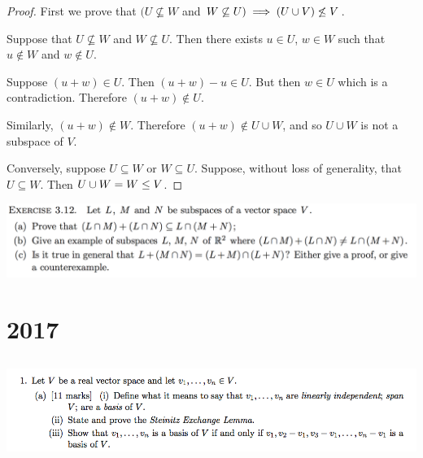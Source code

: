 \documentclass[12pt]{article}
\begin{document}
\begin{proof}
  First we prove that $(U \not\subseteq W$ and
  $W \not\subseteq U) \implies (U \cup V) \not\leq V$.

  Suppose that $U \not\subseteq W$ and $W \not\subseteq U$. Then there exists
  $u \in U$, $w \in W$ such that $u \notin W$ and $w \notin U$.

  Suppose $(u + w) \in U$. Then $(u + w) - u \in U$. But then $w \in U$ which
  is a contradiction. Therefore $(u + w) \notin U$.

  Similarly, $(u + w) \notin W$. Therefore $(u + w) \notin U \cup W$, and so
  $U \cup W$ is not a subspace of $V$.

  Conversely, suppose $U \subseteq W$ or $W \subseteq U$. Suppose, without loss
  of generality, that $U \subseteq W$. Then $U \cup W = W \leq V$.

\end{proof}

\begin{mdframed}
\includegraphics[width=400pt]{img/oxford-prelims-M1-linear-algebra-3-12.png}
\end{mdframed}



\section{2017}

\subsection*{}  %
\begin{mdframed}
\includegraphics[width=400pt]{img/oxford-prelims-2017-A-1-1.png}
\end{mdframed}
\end{document}
